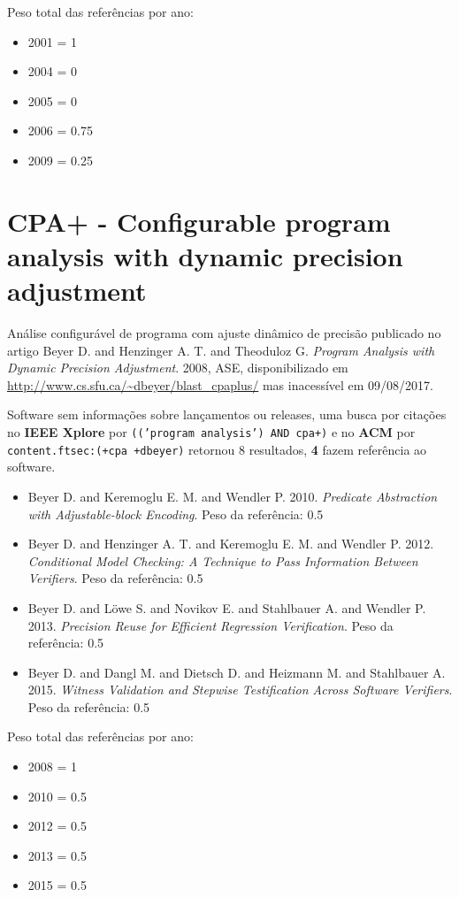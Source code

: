 Peso total das referências por ano:

\begin{itemize}
\item 2001 = 1
\item 2004 = 0
\item 2005 = 0
\item 2006 = 0.75
\item 2009 = 0.25
\end{itemize}


\section{CPA+ - Configurable program analysis with dynamic precision adjustment}

Análise configurável de programa com ajuste dinâmico de precisão
publicado no artigo
Beyer D. and Henzinger A. T. and Theoduloz G.
{\it Program Analysis with Dynamic Precision Adjustment}.
2008,
ASE,
disponibilizado em \url{http://www.cs.sfu.ca/~dbeyer/blast_cpaplus/}
mas inacessível em 09/08/2017.

Software sem informações sobre lançamentos ou releases,
uma busca por citações no {\bf IEEE Xplore} por
\texttt{(('program analysis') AND cpa+)}
e no {\bf ACM} por
\texttt{content.ftsec:(+cpa +dbeyer)}
retornou
8 resultados,
{\bf 4} fazem referência ao software.

\begin{itemize}
\item Beyer D. and Keremoglu E. M. and Wendler P.
      2010.
      {\it Predicate Abstraction with Adjustable-block Encoding}.
      Peso da referência: 0.5
\item Beyer D. and Henzinger A. T. and Keremoglu E. M. and Wendler P.
      2012.
      {\it Conditional Model Checking: A Technique to Pass Information Between Verifiers}.
      Peso da referência: 0.5
\item Beyer D. and L\"{o}we S. and Novikov E. and Stahlbauer A. and Wendler P.
      2013.
      {\it Precision Reuse for Efficient Regression Verification}.
      Peso da referência: 0.5
\item Beyer D. and Dangl M. and Dietsch D. and Heizmann M. and Stahlbauer A.
      2015.
      {\it Witness Validation and Stepwise Testification Across Software Verifiers}.
      Peso da referência: 0.5
\end{itemize}

Peso total das referências por ano:

\begin{itemize}
\item 2008 = 1
\item 2010 = 0.5
\item 2012 = 0.5
\item 2013 = 0.5
\item 2015 = 0.5
\end{itemize}


